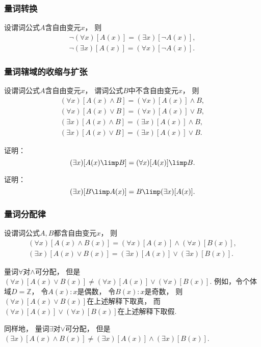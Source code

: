 \subsubsection{量词转换}
设谓词公式\(A\)含自由变元\(x\)，
则\begin{gather}
	\neg(\forall x)[A(x)]
	= (\exists x)[\neg A(x)],
	\label{equation:数理逻辑.量词转换1} \\
	\neg(\exists x)[A(x)]
	= (\forall x)[\neg A(x)].
	\label{equation:数理逻辑.量词转换2}
\end{gather}

\subsubsection{量词辖域的收缩与扩张}
设谓词公式\(A\)含自由变元\(x\)，
谓词公式\(B\)中不含自由变元\(x\)，
则\begin{gather}
	(\forall x)[A(x) \land B]
	= (\forall x)[A(x)] \land B, \\
	(\forall x)[A(x) \lor B]
	= (\forall x)[A(x)] \lor B, \\
	(\exists x)[A(x) \land B]
	= (\exists x)[A(x)] \land B, \\
	(\exists x)[A(x) \lor B]
	= (\exists x)[A(x)] \lor B.
\end{gather}

\begin{example}
证明：\begin{equation}
	(\exists x)[A(x) \limp B]
	= (\forall x)[A(x)] \limp B.
\end{equation}
\end{example}

\begin{example}
证明：\begin{equation}
	(\exists x)[B \limp A(x)]
	= B \limp (\exists x)[A(x)].
\end{equation}
\end{example}

\subsubsection{量词分配律}
设谓词公式\(A,B\)都含自由变元\(x\)，
则\begin{gather}
	(\forall x)[A(x) \land B(x)]
	= (\forall x)[A(x)] \land (\forall x)[B(x)], \\
	(\exists x)[A(x) \lor B(x)]
	= (\exists x)[A(x)] \lor (\exists x)[B(x)].
\end{gather}
\begin{remark}
量词\(\forall\)对\(\land\)可分配，
但是\((\forall x)[A(x) \lor B(x)]
\neq (\forall x)[A(x)] \lor (\forall x)[B(x)]\).
例如，令个体域\(D=\mathbb{Z}\)，
令\(A(x): \text{$x$是偶数}\)，
令\(B(x): \text{$x$是奇数}\)，
则\((\forall x)[A(x) \lor B(x)]\)在上述解释下取真，
而\((\forall x)[A(x)] \lor (\forall x)[B(x)]\)在上述解释下取假.

同样地，
量词\(\exists\)对\(\lor\)可分配，
但是\((\exists x)[A(x) \land B(x)]
\neq (\exists x)[A(x)] \land (\exists x)[B(x)]\).
\end{remark}

